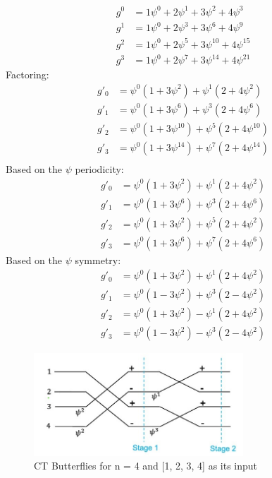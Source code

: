 \documentclass[12pt]{report}
\begin{document}
\begin{align*}
    g^0 &= 1\psi^0 + 2\psi^1 + 3\psi^2 + 4\psi^3 \\
    g^1 &= 1\psi^0 + 2\psi^3 + 3\psi^6 + 4\psi^9 \\
    g^2 &= 1\psi^0 + 2\psi^5 + 3\psi^{10} + 4\psi^{15} \\
    g^3 &= 1\psi^0 + 2\psi^7 + 3\psi^{14} + 4\psi^{21}
\end{align*}
Factoring:
\begin{align*}
    g'_0 &= \psi^0(1 + 3\psi^2) + \psi^1(2 + 4\psi^2) \\
    g'_1 &= \psi^0(1 + 3\psi^6) + \psi^3(2 + 4\psi^6) \\
    g'_2 &= \psi^0(1 + 3\psi^{10}) + \psi^5(2 + 4\psi^{10}) \\
    g'_3 &= \psi^0(1 + 3\psi^{14}) + \psi^7(2 + 4\psi^{14}) \\
\end{align*}
Based on the $\psi$ periodicity:
\begin{align*}
    g'_0 &= \psi^0(1 + 3\psi^2) + \psi^1(2 + 4\psi^2) \\
    g'_1 &= \psi^0(1 + 3\psi^6) + \psi^3(2 + 4\psi^6) \\
    g'_2 &= \psi^0(1 + 3\psi^2) + \psi^5(2 + 4\psi^2) \\
    g'_3 &= \psi^0(1 + 3\psi^6) + \psi^7(2 + 4\psi^6) 
\end{align*}
Based on the $\psi$ symmetry:
\begin{align*}
    g'_0 &= \psi^0(1 + 3\psi^2) + \psi^1(2 + 4\psi^2) \\
    g'_1 &= \psi^0(1 - 3\psi^2) + \psi^3(2 - 4\psi^2) \\
    g'_2 &= \psi^0(1 + 3\psi^2) - \psi^1(2 + 4\psi^2) \\
    g'_3 &= \psi^0(1 - 3\psi^2) - \psi^3(2 - 4\psi^2)
\end{align*}
\begin{figure}[H]
    \centering
    \includegraphics[width=0.7\textwidth]{./ntt_figures/5.jpg}
    \caption{CT Butterflies for n = 4 and [1, 2, 3, 4] as its input}
\end{figure}
\end{document}
